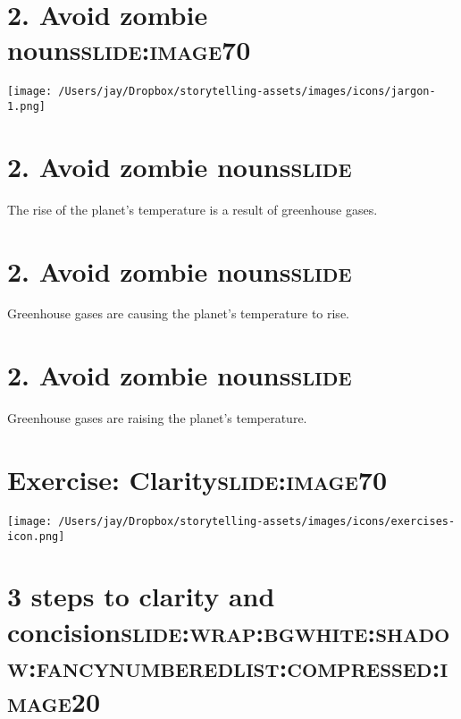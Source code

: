 \documentclass[12pt]{article}
\begin{document}
\section[2. Avoid \textbf{zombie} nouns]{2. Avoid \textbf{zombie} nouns\hfill{}\textsc{slide:image70}}
\label{sec:org1cb55ec}
\begin{center}
\texttt{[image: /Users/jay/Dropbox/storytelling-assets/images/icons/jargon-1.png]}
\end{center}

\section[2. Avoid \textbf{zombie} nouns]{2. Avoid \textbf{zombie} nouns\hfill{}\textsc{slide}}
\label{sec:org2d87d03}
The rise of the planet's temperature is a result of greenhouse gases.

\section[2. Avoid \textbf{zombie} nouns]{2. Avoid \textbf{zombie} nouns\hfill{}\textsc{slide}}
\label{sec:org20abd1d}
Greenhouse gases are causing the planet's temperature to rise.

\section[2. Avoid \textbf{zombie} nouns]{2. Avoid \textbf{zombie} nouns\hfill{}\textsc{slide}}
\label{sec:orga9c779b}
Greenhouse gases are raising the planet's temperature.

\section[Exercise: \textbf{Clarity}]{Exercise: \textbf{Clarity}\hfill{}\textsc{slide:image70}}
\label{sec:org0d6669f}
\begin{center}
\texttt{[image: /Users/jay/Dropbox/storytelling-assets/images/icons/exercises-icon.png]}
\end{center}

\section[3 steps to \textbf{clarity} and \textbf{concision}]{3 steps to \textbf{clarity} and \textbf{concision}\hfill{}\textsc{slide:wrap:bgwhite:shadow:fancynumberedlist:compressed:image20}}
\label{sec:org789e963}
\end{document}
